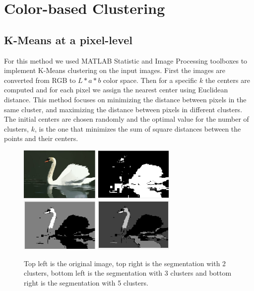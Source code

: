 \documentclass[10pt, twocolumn, twoside]{article}
\newcommand{\squeezeup}{\vspace{-2.5mm}}
\begin{document}
\squeezeup
\section{Color-based Clustering}
\subsection{K-Means at a pixel-level}
\squeezeup
For this method we used MATLAB Statistic and Image Processing toolboxes to implement K-Means clustering on the input images. First the images are converted from RGB to $L*a*b$ color space. Then for a specific $k$ the centers are computed and for each pixel we assign the nearest center using Euclidean distance. This method focuses on minimizing the distance between pixels in the same cluster, and maximizing the distance between pixels in different clusters. The initial centers are chosen randomly and the optimal value for the number of clusters, $k$, is the one that minimizes the sum of square distances between the points and their centers.

\begin{figure}[h!]
    \centering
    \includegraphics[width=1.5in]{images/8068.png}
    \includegraphics[width=1.5in]{images/k_2.png}
    \includegraphics[width=1.5in]{images/k3.png}
    \includegraphics[width=1.5in]{images/k_5.png}

    \caption{Top left is the original image, top right is the segmentation with 2 clusters, bottom left is the segmentation with 3 clusters and bottom right is the segmentation with 5 clusters.}
    \label{fig:reg3}
    \squeezeup
\end{figure}
\end{document}
